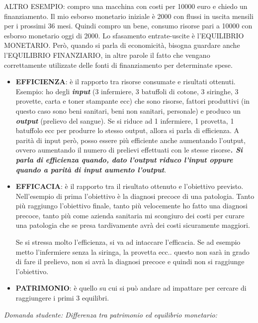 ALTRO ESEMPIO: compro una macchina con costi per 10000 euro e chiedo un finanziamento. Il mio esborso monetario iniziale è 2000 con flussi in uscita mensili per i prossimi 36 mesi. Quindi compro un bene, consumo risorse pari a 10000 con esborso monetario oggi di 2000. Lo sfasamento entrate-uscite è l'EQUILIBRIO MONETARIO. Però, quando si parla di economicità, bisogna guardare anche l'EQUILIBRIO FINANZIARIO, in altre parole il fatto che vengano correttamente utilizzate delle fonti di finanziamento per determinate spese.

\begin{itemize}
\item
  \textbf{EFFICIENZA}: è il rapporto tra risorse consumate e risultati
  ottenuti. Esempio: ho degli \emph{\textbf{input}} (3 infermiere, 3
  batuffoli di cotone, 3 siringhe, 3 provette, carta e toner stampante
  ecc) che sono risorse, fattori produttivi (in questo caso sono beni
  sanitari, beni non sanitari, personale) e produco un
  \emph{\textbf{output}} (prelievo del sangue). Se si riduce ad 1
  infermiere, 1 provetta, 1 batuffolo ecc per produrre lo stesso output,
  allora si parla di efficienza. A parità di input però, posso essere
  più efficiente anche aumentando l'output, ovvero aumentando il numero
  di prelievi effettuati con le stesse risorse\textbf{\emph{. Si parla
  di efficienza quando, dato l'output riduco l'input oppure quando a
  parità di input aumento l'output}}.
\item
  \textbf{EFFICACIA}: è il rapporto tra il risultato ottenuto e
  l'obiettivo previsto. Nell'esempio di prima l'obiettivo è la diagnosi
  precoce di una patologia. Tanto più raggiungo l'obiettivo finale,
  tanto più velocemente ho fatto una diagnosi precoce, tanto più come
  azienda sanitaria mi scongiuro dei costi per curare una patologia che
  se presa tardivamente avrà dei costi sicuramente maggiori.

Se si stressa molto l'efficienza, si va ad intaccare l'efficacia. Se ad
esempio metto l'infermiere senza la siringa, la provetta ecc.. questo
non sarà in grado di fare il prelievo, non si avrà la diagnosi precoce e
quindi non si raggiunge l'obiettivo.

\item
  \textbf{PATRIMONIO}: è quello su cui si può andare ad impattare per
  cercare di raggiungere i primi 3 equilibri.
\end{itemize}

\emph{Domanda studente: Differenza tra patrimonio ed equilibrio
monetario:}

